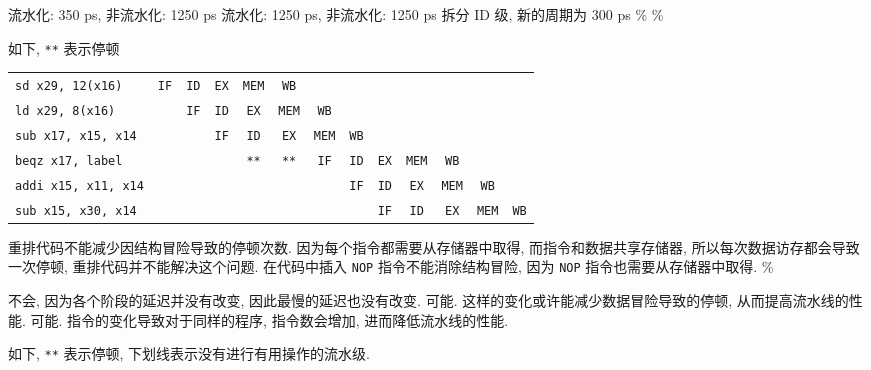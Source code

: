 \documentclass[11pt]{homework}
\begin{document}
\maketitle
\question
\begin{arabicparts}
    \questionpart 流水化: 350 ps, 非流水化: 1250 ps
    \questionpart 流水化: 1250 ps, 非流水化: 1250 ps
    \questionpart 拆分 ID 级, 新的周期为 300 ps
    \%
    \%
\end{arabicparts}
\question
\begin{arabicparts}
    \questionpart 如下, \texttt{**} 表示停顿
    \begin{center}
        \begin{tabular}{lcccccccccccc}
            \texttt{sd   x29, 12(x16)}  & \texttt{IF} & \texttt{ID} & \texttt{EX} & \texttt{MEM} & \texttt{WB}  &              &             &             &              &              &              &             \\
            \texttt{ld   x29, 8(x16)}   &             & \texttt{IF} & \texttt{ID} & \texttt{EX}  & \texttt{MEM} & \texttt{WB}  &             &             &              &              &              &             \\
            \texttt{sub  x17, x15, x14} &             &             & \texttt{IF} & \texttt{ID}  & \texttt{EX}  & \texttt{MEM} & \texttt{WB} &             &              &              &              &             \\
            \texttt{beqz x17, label}    &             &             &             & \texttt{**}  & \texttt{**}  & \texttt{IF}  & \texttt{ID} & \texttt{EX} & \texttt{MEM} & \texttt{WB}  &              &             \\
            \texttt{addi x15, x11, x14} &             &             &             &              &              &              & \texttt{IF} & \texttt{ID} & \texttt{EX}  & \texttt{MEM} & \texttt{WB}  &             \\
            \texttt{sub  x15, x30, x14} &             &             &             &              &              &              &             & \texttt{IF} & \texttt{ID}  & \texttt{EX}  & \texttt{MEM} & \texttt{WB}
        \end{tabular}
    \end{center}
    \questionpart 重排代码不能减少因结构冒险导致的停顿次数. 因为每个指令都需要从存储器中取得, 而指令和数据共享存储器, 所以每次数据访存都会导致一次停顿, 重排代码并不能解决这个问题.
    \questionpart 在代码中插入 \texttt{NOP} 指令不能消除结构冒险, 因为 \texttt{NOP} 指令也需要从存储器中取得.
    \%
\end{arabicparts}
\question
\begin{arabicparts}
    \questionpart 不会, 因为各个阶段的延迟并没有改变, 因此最慢的延迟也没有改变.
    \questionpart 可能. 这样的变化或许能减少数据冒险导致的停顿, 从而提高流水线的性能.
    \questionpart 可能. 指令的变化导致对于同样的程序, 指令数会增加, 进而降低流水线的性能.
\end{arabicparts}
\newpage
\question
如下, \texttt{**} 表示停顿, 下划线表示没有进行有用操作的流水级.
\end{document}
